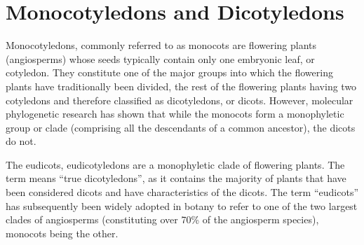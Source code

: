 \documentclass[]{book}
\theoremstyle{definition}
\theoremstyle{definition}
\theoremstyle{definition}
\theoremstyle{remark}
\begin{document}
\section{Monocotyledons and
Dicotyledons}\label{monocotyledons-and-dicotyledons}

Monocotyledons, commonly referred to as monocots are flowering plants
(angiosperms) whose seeds typically contain only one embryonic leaf, or
cotyledon. They constitute one of the major groups into which the
flowering plants have traditionally been divided, the rest of the
flowering plants having two cotyledons and therefore classified as
dicotyledons, or dicots. However, molecular phylogenetic research has
shown that while the monocots form a monophyletic group or clade
(comprising all the descendants of a common ancestor), the dicots do
not.

The eudicots, eudicotyledons are a monophyletic clade of flowering
plants. The term means ``true dicotyledons'', as it contains the
majority of plants that have been considered dicots and have
characteristics of the dicots. The term ``eudicots'' has subsequently
been widely adopted in botany to refer to one of the two largest clades
of angiosperms (constituting over 70\% of the angiosperm species),
monocots being the other.
\end{document}
